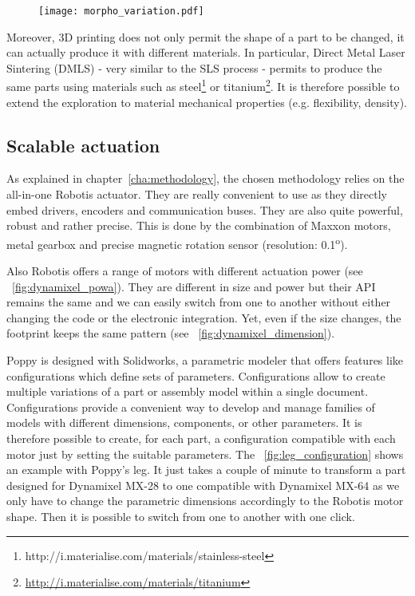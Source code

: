 \begin{figure}[ht]
    \begin{center}
        \texttt{[image: morpho\_variation.pdf]}
    \end{center}
    \caption{}
    \label{fig:exploring-morpho-poppy}
\end{figure}


Moreover, 3D printing does not only permit the shape of a part to be changed, it can actually produce it with different materials. In particular, Direct Metal Laser Sintering (DMLS) - very similar to the SLS process - permits to produce the same parts using materials such as steel\footnote{http://i.materialise.com/materials/stainless-steel} or titanium\footnote{\url{http://i.materialise.com/materials/titanium}}. It is therefore possible to extend the exploration to material mechanical properties (e.g. flexibility, density).


\subsection{Scalable actuation} %
\label{sub:scalable-actuation}
As explained in chapter~\ref{cha:methodology}, the chosen methodology relies on the all-in-one Robotis actuator. They are really convenient to use as they directly embed drivers, encoders and communication buses. They are also quite powerful, robust and rather precise. This is done by the combination of Maxxon motors, metal gearbox and precise magnetic rotation sensor (resolution: 0.1\textsuperscript{o}).

Also Robotis offers a range of motors with different actuation power (see \figurename~\ref{fig:dynamixel_powa}). They are different in size and power but their API remains the same and we can easily switch from one to another without either changing the code or the electronic integration. Yet, even if the size changes, the footprint keeps the same pattern (see \figurename~\ref{fig:dynamixel_dimension}).

Poppy is designed with Solidworks, a parametric modeler that offers features like configurations which define sets of parameters. Configurations allow to create multiple variations of a part or assembly model within a single document. Configurations provide a convenient way to develop and manage families of models with different dimensions, components, or other parameters. It is therefore possible to create, for each part, a configuration compatible with each motor just by setting the suitable parameters. The \figurename~\ref{fig:leg_configuration} shows an example with Poppy's leg. It just takes a couple of minute to transform a part designed for Dynamixel MX-28 to one compatible with Dynamixel MX-64 as we only have to change the parametric dimensions accordingly to the Robotis motor shape. Then it is possible to switch from one to another with one click.

